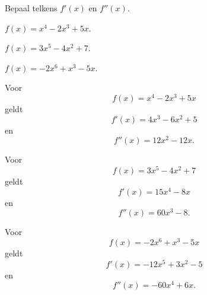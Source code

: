 \documentclass{ximera}
\begin{document}
\begin{oefening}{\oefB\ESS}

Bepaal telkens $f'(x)$ en $f''(x)$.

\begin{question}

\(
f(x)=x^4-2x^3+5x.
\)

\end{question}

\begin{question}

\(
f(x)=3x^5-4x^2+7.
\)

\end{question}

\begin{question}

\(
f(x)=-2x^6+x^3-5x.
\)

\end{question}

\begin{oplossing}

Voor
\[
f(x)=x^4-2x^3+5x
\]
geldt
\[
\boxed{f'(x)=4x^3-6x^2+5}
\]
en
\[
\boxed{f''(x)=12x^2-12x}.
\]

Voor
\[
f(x)=3x^5-4x^2+7
\]
geldt
\[
\boxed{f'(x)=15x^4-8x}
\]
en
\[
\boxed{f''(x)=60x^3-8}.
\]

Voor
\[
f(x)=-2x^6+x^3-5x
\]
geldt
\[
\boxed{f'(x)=-12x^5+3x^2-5}
\]
en
\[
\boxed{f''(x)=-60x^4+6x}.
\]

\end{oplossing}

\end{oefening}


\end{document}
